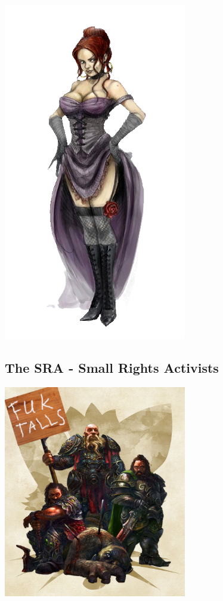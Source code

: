 \begin{center}
\includegraphics[width=80mm]{./content/img/jennies3.png}
\begin{figure}[h]
\end{figure}
\end{center}


\smallskip


\subsection*{The SRA - Small Rights Activists} 

\begin{center}
\includegraphics[width=80mm]{./content/img/sra3.jpg}
\begin{figure}[h]
\end{figure}
\end{center}


